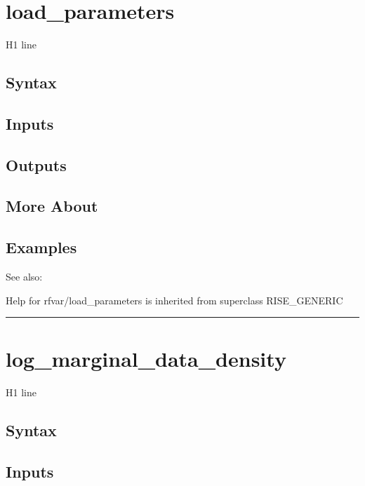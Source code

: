 \documentclass[letterpaper,10pt,english]{sphinxmanual}
\begin{document}
\section{load\_parameters}
\label{classes/models/@rfvar/rfvar:id56}\label{classes/models/@rfvar/rfvar:load-parameters}
H1 line


\subsection{Syntax}
\label{classes/models/@rfvar/rfvar:id57}

\subsection{Inputs}
\label{classes/models/@rfvar/rfvar:id58}

\subsection{Outputs}
\label{classes/models/@rfvar/rfvar:id59}

\subsection{More About}
\label{classes/models/@rfvar/rfvar:id60}

\subsection{Examples}
\label{classes/models/@rfvar/rfvar:id61}
See also:

Help for rfvar/load\_parameters is inherited from superclass RISE\_GENERIC


\bigskip\hrule{}\bigskip



\section{log\_marginal\_data\_density}
\label{classes/models/@rfvar/rfvar:log-marginal-data-density}\label{classes/models/@rfvar/rfvar:id62}
H1 line


\subsection{Syntax}
\label{classes/models/@rfvar/rfvar:id63}

\subsection{Inputs}
\label{classes/models/@rfvar/rfvar:id64}
\end{document}

